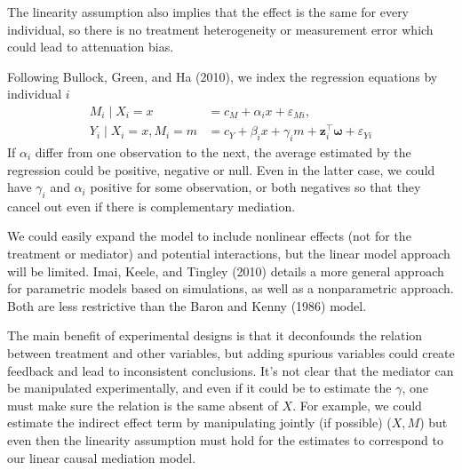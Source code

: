 \documentclass[
  11pt,
  letterpaper,
]{scrbook}
\theoremstyle{definition}
\theoremstyle{remark}
\begin{document}
The linearity assumption also implies that the effect is the same for
every individual, so there is no treatment heterogeneity or measurement
error which could lead to attenuation bias.

Following Bullock, Green, and Ha (2010), we index the regression
equations by individual \(i\) \begin{align*}
M_i\mid X_i=x &= c_M + \alpha_i x + \varepsilon_{Mi},\\
Y_i \mid X_i=x, M_i=m &=  c_Y + \beta_i x + \gamma_i m + \mathbf{z}_i^\top\boldsymbol{\omega} + \varepsilon_{Yi}
\end{align*} If \(\alpha_i\) differ from one observation to the next,
the average estimated by the regression could be positive, negative or
null. Even in the latter case, we could have \(\gamma_i\) and
\(\alpha_i\) positive for some observation, or both negatives so that
they cancel out even if there is complementary mediation.

We could easily expand the model to include nonlinear effects (not for
the treatment or mediator) and potential interactions, but the linear
model approach will be limited. Imai, Keele, and Tingley (2010) details
a more general approach for parametric models based on simulations, as
well as a nonparametric approach. Both are less restrictive than the
Baron and Kenny (1986) model.

The main benefit of experimental designs is that it deconfounds the
relation between treatment and other variables, but adding spurious
variables could create feedback and lead to inconsistent conclusions.
It's not clear that the mediator can be manipulated experimentally, and
even if it could be to estimate the \(\gamma\), one must make sure the
relation is the same absent of \(X\). For example, we could estimate the
indirect effect term by manipulating jointly (if possible) (\(X, M\))
but even then the linearity assumption must hold for the estimates to
correspond to our linear causal mediation model.
\end{document}

